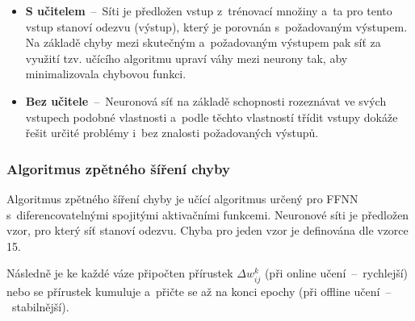 \documentclass[a4paper,12pt]{article}
\begin{document}
{{{{{{\begin{itemize}
\item \textbf{S učitelem}~--~Síti je předložen vstup z~trénovací množiny a~ta pro tento vstup stanoví odezvu (výstup), který je porovnán s~požadovaným výstupem. Na základě chyby mezi skutečným a~požadovaným výstupem pak síť za využití tzv. učícího algoritmu upraví váhy mezi neurony tak, aby minimalizovala chybovou funkci.

\item \textbf{Bez učitele}~--~Neuronová síť na základě schopnosti rozeznávat ve svých vstupech podobné vlastnosti a~podle těchto vlastností třídit vstupy dokáže řešit určité problémy i~bez znalosti požadovaných výstupů.~\cite{nn}
\end{itemize}

\subsubsection{Algoritmus zpětného šíření chyby}

Algoritmus zpětného šíření chyby je učící algoritmus určený pro FFNN s~diferencovatelnými spojitými aktivačními funkcemi. Neuronové síti je předložen vzor, pro který síť stanoví odezvu. Chyba pro jeden vzor je definována dle vzorce 15.~\cite{nn}


Následně je ke každé váze připočten přírustek $\Delta w_{ij}^k$ (při online učení~--~rychlejší) nebo se přírustek kumuluje a~přičte se až na konci epochy (při offline učení~--~stabilnější).~\cite{nn}


}}}}}}
\end{document}
